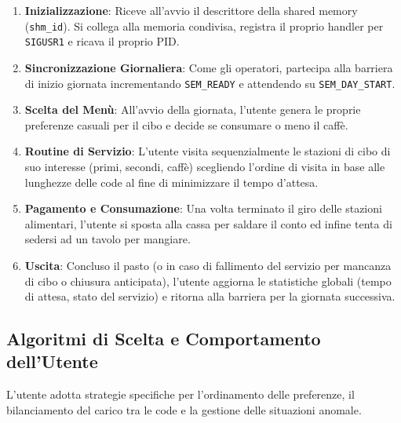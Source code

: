 \documentclass[a4paper,12pt]{article}
\begin{document}
\begin{enumerate}
  \item \textbf{Inizializzazione}: Riceve all'avvio il descrittore della shared memory (\texttt{shm\_id}). Si collega alla memoria condivisa, registra il proprio handler per \texttt{SIGUSR1} e ricava il proprio PID.
  \item \textbf{Sincronizzazione Giornaliera}: Come gli operatori, partecipa alla barriera di inizio giornata incrementando \texttt{SEM\_READY} e attendendo su \texttt{SEM\_DAY\_START}.
  \item \textbf{Scelta del Menù}: All'avvio della giornata, l'utente genera le proprie preferenze casuali per il cibo e decide se consumare o meno il caffè.
  \item \textbf{Routine di Servizio}: L'utente visita sequenzialmente le stazioni di cibo di suo interesse (primi, secondi, caffè) scegliendo l'ordine di visita in base alle lunghezze delle code al fine di minimizzare il tempo d'attesa.
  \item \textbf{Pagamento e Consumazione}: Una volta terminato il giro delle stazioni alimentari, l'utente si sposta alla cassa per saldare il conto ed infine tenta di sedersi ad un tavolo per mangiare.
  \item \textbf{Uscita}: Concluso il pasto (o in caso di fallimento del servizio per mancanza di cibo o chiusura anticipata), l'utente aggiorna le statistiche globali (tempo di attesa, stato del servizio) e ritorna alla barriera per la giornata successiva.
\end{enumerate}

\subsection{Algoritmi di Scelta e Comportamento dell'Utente}

L'utente adotta strategie specifiche per l'ordinamento delle preferenze, il bilanciamento del carico tra le code e la gestione delle situazioni anomale.
\end{document}
